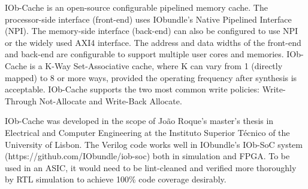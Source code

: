 %

IOb-Cache is an open-source configurable pipelined memory cache. The
processor-side interface (front-end) uses IObundle's Native Pipelined Interface
(NPI). The memory-side interface (back-end) can also be configured to use NPI or
the widely used AXI4 interface. The address and data widths of the front-end and
back-end are configurable to support multiple user cores and memories. IOb-Cache
is a K-Way Set-Associative cache, where K can vary from 1 (directly mapped) to 8
or more ways, provided the operating frequency after synthesis is
acceptable. IOb-Cache supports the two most common write policies: Write-Through
Not-Allocate and Write-Back Allocate.

IOb-Cache was developed in the scope of João Roque's master's thesis in
Electrical and Computer Engineering at the Instituto Superior Técnico of the
University of Lisbon. The Verilog code works well in IObundle's IOb-SoC system
(https://github.com/IObundle/iob-soc) both in simulation and FPGA. To be used in
an ASIC, it would need to be lint-cleaned and verified more thoroughly by RTL
simulation to achieve 100\% code coverage desirably.
